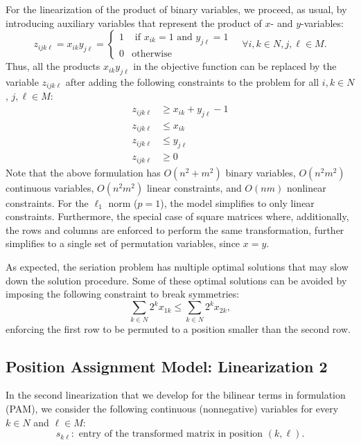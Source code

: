 \documentclass[a4paper,11pt, reqno]{amsart}
\begin{document}
For the linearization of the product of binary variables, we proceed, as usual, by introducing auxiliary variables that represent the product of $x$- and $y$-variables:
$$
z_{ijk\ell } = x_{ik} y_{j\ell} = \begin{cases}
1 & \mbox{ if $x_{ik}=1$ and $y_{j\ell }=1$}\\
0 & \mbox{otherwise}
\end{cases} \quad \forall i, k \in N, j, \ell  \in M.
$$
Thus, all the products $x_{ik} y_{j\ell }$ in the objective function can be replaced by the variable $z_{ijk\ell }$ after adding the following constraints to the problem for all $i, k \in N$, $j, \ell  \in M$:
\begin{align*}
    z_{ijk\ell } &\geq x_{ik}+y_{j\ell }-1\\
    z_{ijk\ell } &\leq x_{ik} \\
    z_{ijk\ell } &\leq y_{j\ell }\\
    z_{ijk\ell } &\ge 0
\end{align*}
Note that the above formulation has $O(n^2 + m^2)$ binary variables, $O(n^2 m^2)$ continuous variables, $O(n^2 m^2)$ linear constraints, and $O(nm)$ nonlinear constraints. For the $\ell_1$ norm ($p=1$), the model simplifies to only linear constraints. Furthermore, the special case of square matrices where, additionally, the rows and columns are enforced to perform the same transformation, further simplifies to a single set of permutation variables, since $x=y$.

As expected, the seriation problem has multiple optimal solutions that may slow down the solution procedure. Some of these optimal solutions can be avoided by imposing the following constraint to break symmetries:
$$
\sum_{k\in N} 2^k x_{1k} \leq \sum_{k\in N} 2^k x_{2k},
$$
enforcing the first row to be permuted to a position smaller than the second row. 



\subsection{Position Assignment Model: Linearization 2}

In the second linearization that we develop for the bilinear terms in formulation (PAM), we consider the following continuous (nonnegative) variables for every 
$k\in N$ and $\ell \in M$:
$$
s_{k\ell}: \text{ entry of the transformed matrix in position $(k,\ell)$.}
$$
\end{document}
